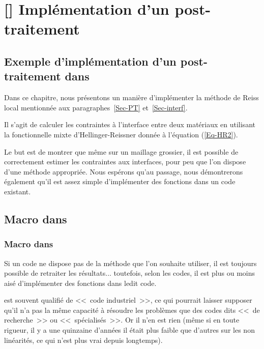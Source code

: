 \ifVersionAvecExemplesSepares
   \chapter{[\ansys] Implémentation d'un post-traitement}
\else
   \section{Exemple d'implémentation d'un post-traitement dans \ansys}
\fi

Dans ce chapitre, nous présentons un manière d'implémenter la méthode de Reiss local mentionnée aux
paragraphes~\ref{Sec-PT} et~\ref{Sec-interf}.

Il s'agit de calculer les contraintes à l'interface entre deux matériaux en utilisant la fonctionnelle mixte d'Hellinger-Reissner
donnée à l'équation (\ref{Eq-HR2}).

\medskip
Le but est de montrer que même sur un maillage grossier, il est possible de correctement estimer les contraintes
aux interfaces, pour peu que l'on dispose d'une méthode appropriée. Nous espérons qu'au passage, nous
démontrerons également qu'il est assez simple d'implémenter des fonctions dans un code existant.





\medskip
\ifVersionAvecExemplesSepares
   \section{Macro dans \ansys}
\else
   \subsection{Macro dans \ansys}
\fi

Si un code ne dispose pas de la méthode que l'on souhaite utiliser, il est toujours possible de retraiter les
résultats... toutefois, selon les codes, il est plus ou moins aisé d'implémenter des fonctions dans ledit code.

\medskip
\ansys est souvent qualifié de <<~code industriel~>>, ce qui pourrait laisser supposer qu'il n'a pas la même capacité
à résoudre les problèmes que des codes dits <<~de recherche~>> ou <<~spécialisés~>>.
Or il n'en est rien (même si en toute rigueur, il y a une quinzaine d'années il était plus faible que d'autres sur
les non linéarités, ce qui n'est plus vrai depuis longtemps).

